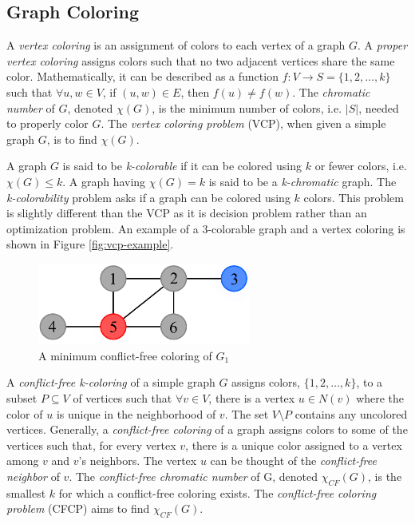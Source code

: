 \documentclass{sig-alternate}
\begin{document}
\subsection{Graph Coloring}
\label{sec:coloring}
A \emph{vertex coloring} is an assignment of colors to each vertex of a graph $G$. A \emph{proper vertex coloring} assigns colors such that no two adjacent vertices share the same color. Mathematically, it can be described as a function $f : V \rightarrow S = \{1, 2, \dots, k\}$ such that $\forall u,w \in V$, if $(u,w) \in E$, then $f(u) \neq f(w)$. The \emph{chromatic number} of $G$, denoted $\chi(G)$, is the minimum number of colors, i.e. $|S|$, needed to properly color $G$. The \emph{vertex coloring problem} (VCP), when given a simple graph $G$, is to find $\chi(G)$. \cite{bondy1976graph}

A graph $G$ is said to be \emph{k-colorable} if it can be colored using $k$ or fewer colors, i.e. $\chi(G) \leq k$. A graph having $\chi(G) = k$ is said to be a \emph{k-chromatic} graph. The \emph{k-colorability} problem asks if a graph can be colored using $k$ colors. This problem is slightly different than the VCP as it is decision problem rather than an optimization problem. An example of a 3-colorable graph and a vertex coloring is shown in Figure \ref{fig:vcp-example}.

\begin{figure}[h]
	\centering
	\includegraphics[width=7cm]{../figures/example-cfcp.pdf}
	\caption{A minimum conflict-free coloring of $G_1$}\label{fig:cfcp-example}
\end{figure}

A \emph{conflict-free k-coloring} of a simple graph $G$ assigns colors, $\{1, 2, \ldots, k\}$, to a subset $P \subseteq V$ of vertices such that $\forall v \in V$, there is a vertex $u \in N(v)$ where the color of $u$ is unique in the neighborhood of $v$. The set $V \setminus P$ contains any uncolored vertices. Generally, a \emph{conflict-free coloring} of a graph assigns colors to some of the vertices such that, for every vertex $v$, there is a unique color assigned to a vertex among $v$ and $v$'s neighbors. The vertex $u$ can be thought of the \emph{conflict-free neighbor} of $v$. The \emph{conflict-free chromatic number} of G, denoted $\chi_{CF}(G)$, is the smallest $k$ for which a conflict-free coloring exists. The \emph{conflict-free coloring problem} (CFCP) aims to find $\chi_{CF}(G)$. \cite{abel2017three}
\end{document}
